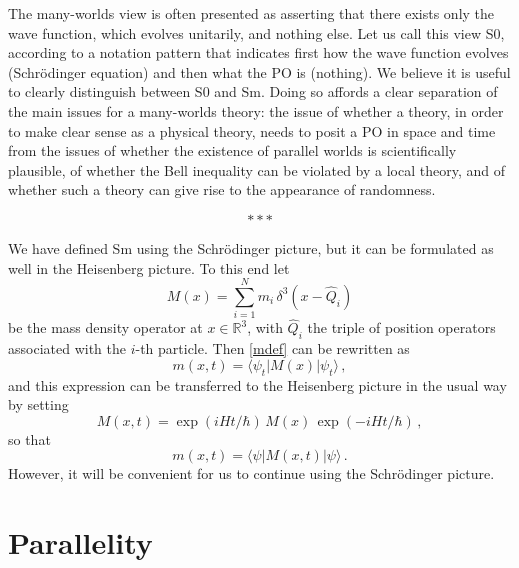 \documentclass[12pt]{article}
\newcommand{\RRR}{\mathbb{R}}
\newcommand{\scp}[2]{\langle #1|#2 \rangle}
\newcommand{\z}[1]{{#1}}
\begin{document}
The many-worlds view is often presented as asserting that there exists only the wave function, which evolves unitarily, and nothing else. Let us call this view S0, according to a notation pattern that indicates first how the wave function evolves (Schr\"odinger equation) and then what the PO is (nothing).  
\z{We} believe it is useful to clearly distinguish between S0 and Sm. Doing so affords a clear separation of the main issues for a many-worlds theory: the issue of whether a theory, in order to make clear sense as a physical theory, needs to posit a PO in space and time from the issues of whether the existence of parallel worlds is scientifically plausible, of whether the Bell inequality can be violated by a local theory, and of whether such a theory can give rise to the appearance of randomness.

\[***\]

We have defined Sm using the Schr\"odinger picture, but it can be formulated as well in the Heisenberg picture. To this end let
\begin{equation}\label{Mdef}
M(x) = \sum_{i=1}^N m_i \, \delta^3(x-\hat{Q}_i)
\end{equation}
be the mass density operator at $x\in\RRR^3$, with $\hat{Q}_i$ the triple of position operators associated with the $i$-th particle. Then \eqref{mdef} can be rewritten as
\begin{equation}
m(x,t) = \scp{\psi_t}{M(x)|\psi_t}\,,
\end{equation}
and this expression can be transferred to the Heisenberg picture in the usual way by setting
\begin{equation}
M(x,t) = \exp(iHt/\hbar) \, M(x) \, \exp(-iHt/\hbar)\,,
\end{equation}
so that
\begin{equation}
m(x,t) = \scp{\psi}{M(x,t)|\psi}\,.
\end{equation}
However, it will be convenient for us to continue using the Schr\"odinger picture.




\section{Parallelity} \label{sec:parallelity}
\end{document}
